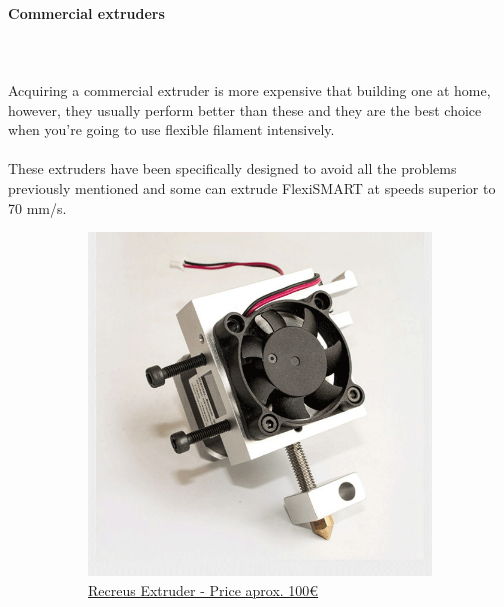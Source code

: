 \documentclass[11pt,a4paper]{article}
\begin{document}
			\paragraph{Commercial extruders}\mbox{}\\\\
Acquiring a commercial extruder is more expensive that building one at home, however, they usually perform better than these and they are the best choice when you’re going to use flexible filament intensively.
\\\\
These extruders have been specifically designed to avoid all the problems previously mentioned and some can extrude FlexiSMART at speeds superior to 70 mm/s.
\begin{figure}[H]
    \centering
    \begin{subfigure}[b]{0.4\textwidth}
        \includegraphics[width=\textwidth,cfbox=azul_marcos 4pt 0pt]{FOTOS/EXTRUSOR5}
		\caption*{\href{http://www.recreus.com}{{\footnotesize Recreus Extruder - Price aprox. 100\euro}}}
    \end{subfigure}
    ~ \qquad%
    \begin{subfigure}[b]{0.4\textwidth}

\end{subfigure}
\end{figure}
\end{document}
